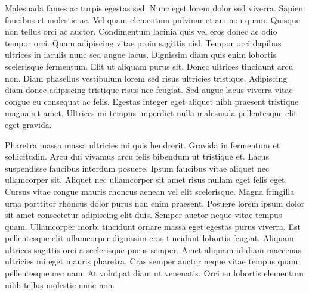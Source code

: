 \documentclass[]{tufte-handout}
\begin{document}
Malesuada fames ac turpis egestas sed. Nunc eget lorem dolor sed
viverra. Sapien faucibus et molestie ac. Vel quam elementum pulvinar
etiam non quam. Quisque non tellus orci ac auctor. Condimentum lacinia
quis vel eros donec ac odio tempor orci. Quam adipiscing vitae proin
sagittis nisl. Tempor orci dapibus ultrices in iaculis nunc sed augue
lacus. Dignissim diam quis enim lobortis scelerisque fermentum. Elit ut
aliquam purus sit. Donec ultrices tincidunt arcu non. Diam phasellus
vestibulum lorem sed risus ultricies tristique. Adipiscing diam donec
adipiscing tristique risus nec feugiat. Sed augue lacus viverra vitae
congue eu consequat ac felis. Egestas integer eget aliquet nibh praesent
tristique magna sit amet. Ultrices mi tempus imperdiet nulla malesuada
pellentesque elit eget gravida.

Pharetra massa massa ultricies mi quis hendrerit. Gravida in fermentum
et sollicitudin. Arcu dui vivamus arcu felis bibendum ut tristique et.
Lacus suspendisse faucibus interdum posuere. Ipsum faucibus vitae
aliquet nec ullamcorper sit. Aliquet nec ullamcorper sit amet risus
nullam eget felis eget. Cursus vitae congue mauris rhoncus aenean vel
elit scelerisque. Magna fringilla urna porttitor rhoncus dolor purus non
enim praesent. Posuere lorem ipsum dolor sit amet consectetur adipiscing
elit duis. Semper auctor neque vitae tempus quam. Ullamcorper morbi
tincidunt ornare massa eget egestas purus viverra. Est pellentesque elit
ullamcorper dignissim cras tincidunt lobortis feugiat. Aliquam ultrices
sagittis orci a scelerisque purus semper. Amet aliquam id diam maecenas
ultricies mi eget mauris pharetra. Cras semper auctor neque vitae tempus
quam pellentesque nec nam. At volutpat diam ut venenatis. Orci eu
lobortis elementum nibh tellus molestie nunc non.
\end{document}
